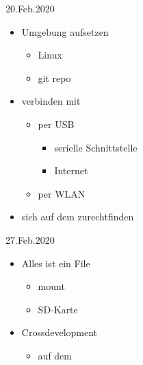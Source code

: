 \documentclass{beamer}
\begin{document}
\begin{frame}{20.Feb.2020}
\begin{itemize}
 \item Umgebung aufsetzen
 \begin{itemize}
  \item Linux
  \item git repo
 \end{itemize}
\item \target verbinden mit \host
 \begin{itemize}
  \item per USB
  \begin{itemize}
   \item serielle Schnittstelle 
   \item Internet
  \end{itemize}
  \item per WLAN
 \end{itemize}
\item sich auf dem \target zurechtfinden
\end{itemize}
\end{frame}

\begin{frame}{27.Feb.2020}
 \begin{itemize}
  \item Alles ist ein File
  \begin{itemize}
   \item {} mount
   \item {} SD-Karte
  \end{itemize}
  \item Crossdevelopment
  \begin{itemize}
   \item auf dem \targetS
  \end{itemize}
 \end{itemize}
\end{frame}
\end{document}
